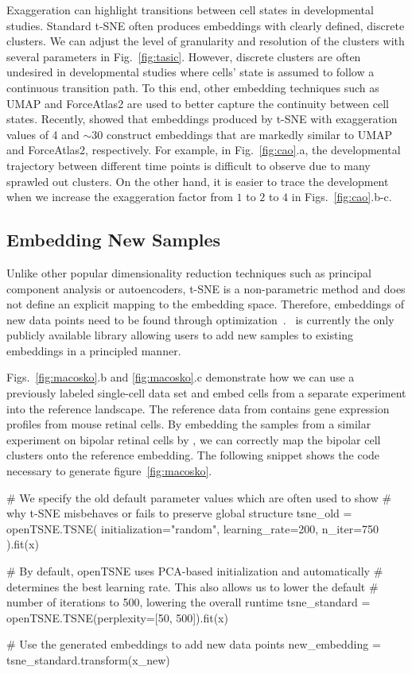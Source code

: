 \documentclass[article]{jss}
\newcommand{\opentsne}{\pkg{openTSNE}}
\begin{document}
Exaggeration can highlight transitions between cell states in developmental
studies. Standard t-SNE often produces embeddings with clearly defined, discrete
clusters. We can adjust the level of granularity and resolution of the clusters
with several parameters in Fig.~\ref{fig:tasic}. However, discrete clusters are
often undesired in developmental studies where cells' state is assumed to follow
a continuous transition path. To this end, other embedding techniques such as
UMAP and ForceAtlas2 are used to better capture the continuity between cell
states. Recently, \citet{bohm2020unifying} showed that
embeddings produced by t-SNE with exaggeration values of 4 and $\sim30$
construct embeddings that are markedly similar to UMAP and ForceAtlas2,
respectively. For example, in Fig.~\ref{fig:cao}.a, the developmental trajectory
between different time points is difficult to observe due to many sprawled out
clusters. On the other hand, it is easier to trace the development when we
increase the exaggeration factor from $1$ to $2$ to $4$ in
Figs.~\ref{fig:cao}.b-c.

\subsection{Embedding New Samples}

Unlike other popular dimensionality reduction techniques such as principal
component analysis or autoencoders, t-SNE is a non-parametric method and does
not define an explicit mapping to the embedding space. Therefore, embeddings of
new data points need to be found through
optimization~\citep{policar2021embedding}. \opentsne\ is currently the only
publicly available library allowing users to add new samples to existing
embeddings in a principled manner.

Figs.~\ref{fig:macosko}.b and \ref{fig:macosko}.c demonstrate how we can use a
previously labeled single-cell data set and embed cells from a separate
experiment into the reference landscape. The reference data from
\citet{macosko2015highly} contains gene expression profiles from mouse retinal
cells. By embedding the samples from a similar experiment on bipolar retinal
cells by \citet{shekhar2016comprehensive}, we can correctly map the bipolar
cell clusters onto the reference embedding. The following snippet shows the
code necessary to generate figure~\ref{fig:macosko}.
\begin{CodeChunk}
\begin{CodeInput}
# We specify the old default parameter values which are often used to show
# why t-SNE misbehaves or fails to preserve global structure
tsne_old = openTSNE.TSNE(
    initialization="random", learning_rate=200, n_iter=750
).fit(x)

# By default, openTSNE uses PCA-based initialization and automatically
# determines the best learning rate. This also allows us to lower the default
# number of iterations to 500, lowering the overall runtime
tsne_standard = openTSNE.TSNE(perplexity=[50, 500]).fit(x)

# Use the generated embeddings to add new data points
new_embedding = tsne_standard.transform(x_new)
\end{CodeInput}
\end{CodeChunk}
\end{document}
